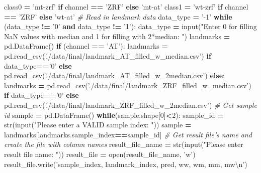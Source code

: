 \documentclass[10pt,letterpaper]{article}
\newenvironment{Shaded}{\begin{snugshade}}{\end{snugshade}}
\newcommand{\KeywordTok}[1]{\textcolor[rgb]{0.13,0.29,0.53}{\textbf{#1}}}
\newcommand{\DecValTok}[1]{\textcolor[rgb]{0.00,0.00,0.81}{#1}}
\newcommand{\CharTok}[1]{\textcolor[rgb]{0.31,0.60,0.02}{#1}}
\newcommand{\StringTok}[1]{\textcolor[rgb]{0.31,0.60,0.02}{#1}}
\newcommand{\CommentTok}[1]{\textcolor[rgb]{0.56,0.35,0.01}{\textit{#1}}}
\newcommand{\ControlFlowTok}[1]{\textcolor[rgb]{0.13,0.29,0.53}{\textbf{#1}}}
\newcommand{\OperatorTok}[1]{\textcolor[rgb]{0.81,0.36,0.00}{\textbf{#1}}}
\newcommand{\BuiltInTok}[1]{#1}
\newcommand{\NormalTok}[1]{#1}
\begin{document}
\begin{Shaded}
\begin{Highlighting}[]
\NormalTok{    class0 }\OperatorTok{=} \StringTok{'mt-zrf'} \ControlFlowTok{if}\NormalTok{ channel }\OperatorTok{==} \StringTok{'ZRF'} \ControlFlowTok{else} \StringTok{'mt-at'}
\NormalTok{    class1 }\OperatorTok{=} \StringTok{'wt-zrf'} \ControlFlowTok{if}\NormalTok{ channel }\OperatorTok{==} \StringTok{'ZRF'} \ControlFlowTok{else} \StringTok{'wt-at'}
    \CommentTok{# Read in landmark data}
\NormalTok{    data_type }\OperatorTok{=} \StringTok{'-1'}
    \ControlFlowTok{while}\NormalTok{ (data_type }\OperatorTok{!=} \StringTok{'0'} \KeywordTok{and}\NormalTok{ data_type }\OperatorTok{!=} \StringTok{'1'}\NormalTok{):}
\NormalTok{        data_type }\OperatorTok{=} \BuiltInTok{input}\NormalTok{(}\StringTok{"Enter 0 for filling NaN values with median and 1 for filling with 2*median: "}\NormalTok{)}
\NormalTok{    landmarks }\OperatorTok{=}\NormalTok{ pd.DataFrame()}
    \ControlFlowTok{if}\NormalTok{ (channel }\OperatorTok{==} \StringTok{'AT'}\NormalTok{):}
\NormalTok{        landmarks }\OperatorTok{=}\NormalTok{ pd.read_csv(}\StringTok{'./data/final/landmark_AT_filled_w_median.csv'}\NormalTok{) }\ControlFlowTok{if}\NormalTok{ data_type}\OperatorTok{==}\StringTok{'0'} \ControlFlowTok{else}\NormalTok{ pd.read_csv(}\StringTok{'./data/final/landmark_AT_filled_w_2median.csv'}\NormalTok{)}
    \ControlFlowTok{else}\NormalTok{:}
\NormalTok{        landmarks }\OperatorTok{=}\NormalTok{ pd.read_csv(}\StringTok{'./data/final/landmark_ZRF_filled_w_median.csv'}\NormalTok{) }\ControlFlowTok{if}\NormalTok{ data_type}\OperatorTok{==}\StringTok{'0'} \ControlFlowTok{else}\NormalTok{ pd.read_csv(}\StringTok{'./data/final/landmark_ZRF_filled_w_2median.csv'}\NormalTok{)}
    \CommentTok{# Get sample id}
\NormalTok{    sample }\OperatorTok{=}\NormalTok{ pd.DataFrame()}
    \ControlFlowTok{while}\NormalTok{(sample.shape[}\DecValTok{0}\NormalTok{]}\OperatorTok{<}\DecValTok{2}\NormalTok{):}
\NormalTok{        sample_id }\OperatorTok{=} \BuiltInTok{str}\NormalTok{(}\BuiltInTok{input}\NormalTok{(}\StringTok{"Please enter a VALID sample index: "}\NormalTok{))}
\NormalTok{        sample }\OperatorTok{=}\NormalTok{ landmarks[landmarks.sample_index}\OperatorTok{==}\NormalTok{sample_id]}
    \CommentTok{# Get result file's name and create the file with column names}
\NormalTok{    result_file_name }\OperatorTok{=} \BuiltInTok{str}\NormalTok{(}\BuiltInTok{input}\NormalTok{(}\StringTok{"Please enter result file name: "}\NormalTok{))}
\NormalTok{    result_file }\OperatorTok{=} \BuiltInTok{open}\NormalTok{(result_file_name, }\StringTok{'w'}\NormalTok{)}
\NormalTok{    result_file.write(}\StringTok{'sample_index, landmark_index, pred, ww, wm, mm, mw}\CharTok{\textbackslash{}n}\StringTok{'}\NormalTok{)}

\end{Highlighting}
\end{Shaded}
\end{document}
